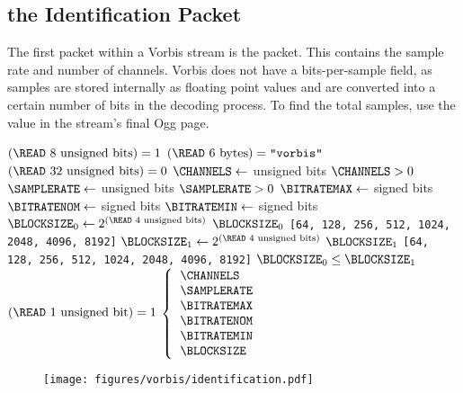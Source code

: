 \subsection{the Identification Packet}
The first packet within a Vorbis stream is the  packet.
This contains the sample rate and number of channels.
Vorbis does not have a bits-per-sample field, as samples
are stored internally as floating point values and are
converted into a certain number of bits in the decoding process.
To find the total samples, use the  value
in the stream's final Ogg page.
\par
\noindent
{
\ASSERT $(\text{\READ 8 unsigned bits}) = 1$
\ASSERT $(\text{\READ 6 bytes}) = \texttt{"vorbis"}$\;
\BlankLine
\ASSERT $(\text{\READ 32 unsigned bits}) = 0$
$\CHANNELS \leftarrow$  unsigned bits\;
\ASSERT $\CHANNELS > 0$\;
$\SAMPLERATE \leftarrow$  unsigned bits\;
\ASSERT $\SAMPLERATE > 0$\;
$\BITRATEMAX \leftarrow$  signed bits\;
$\BITRATENOM \leftarrow$  signed bits\;
$\BITRATEMIN \leftarrow$  signed bits\;
$\text{\BLOCKSIZE}_0 \leftarrow 2 ^ {(\text{\READ 4 unsigned bits)}}$\;
\ASSERT $\text{\BLOCKSIZE}_0$ \IN \texttt{[64, 128, 256, 512, 1024, 2048, 4096, 8192]}\;
$\text{\BLOCKSIZE}_1 \leftarrow 2 ^ {(\text{\READ 4 unsigned bits})}$\;
\ASSERT $\text{\BLOCKSIZE}_1$ \IN \texttt{[64, 128, 256, 512, 1024, 2048, 4096, 8192]}\;
\ASSERT $\text{\BLOCKSIZE}_0 \leq \text{\BLOCKSIZE}_1$\;
\ASSERT $\text{(\READ 1 unsigned bit)} = 1$
\BlankLine
\Return $\left\lbrace\begin{tabular}{l}
\CHANNELS \\
\SAMPLERATE \\
\BITRATEMAX \\
\BITRATENOM \\
\BITRATEMIN \\
\BLOCKSIZE \\
\end{tabular}\right.$\;
\EALGORITHM
}
\begin{figure}[h]
\texttt{[image: figures/vorbis/identification.pdf]}
\end{figure}

